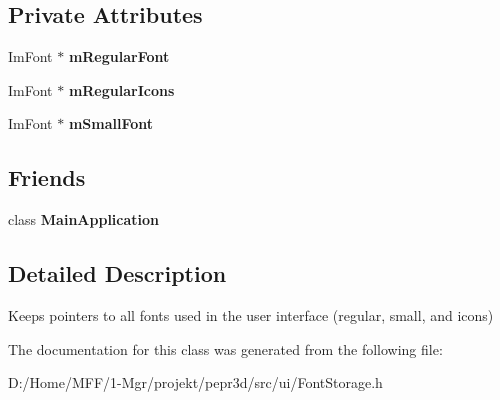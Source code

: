 \subsection*{Private Attributes}
\begin{DoxyCompactItemize}
\item 
\mbox{\label{classpepr3d_1_1_font_storage_a3f57a61767609567b65f13b0deb5fc32}} 
Im\+Font $\ast$ {\bfseries m\+Regular\+Font}
\item 
\mbox{\label{classpepr3d_1_1_font_storage_a048b9a5918c273a439c551922a324dad}} 
Im\+Font $\ast$ {\bfseries m\+Regular\+Icons}
\item 
\mbox{\label{classpepr3d_1_1_font_storage_a6d097561af42377ed7f1434c8b39e6e1}} 
Im\+Font $\ast$ {\bfseries m\+Small\+Font}
\end{DoxyCompactItemize}
\subsection*{Friends}
\begin{DoxyCompactItemize}
\item 
\mbox{\label{classpepr3d_1_1_font_storage_a2a5e494cf46105f3943727a5bcaa1133}} 
class {\bfseries Main\+Application}
\end{DoxyCompactItemize}


\subsection{Detailed Description}
Keeps pointers to all fonts used in the user interface (regular, small, and icons) 

The documentation for this class was generated from the following file\+:\begin{DoxyCompactItemize}
\item 
D\+:/\+Home/\+M\+F\+F/1-\/\+Mgr/projekt/pepr3d/src/ui/Font\+Storage.\+h\end{DoxyCompactItemize}
